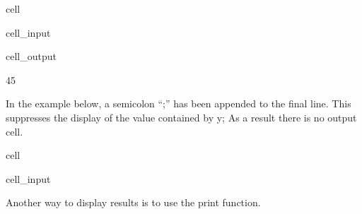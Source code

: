 \documentclass[letterpaper,10pt,english]{jupyterBook}
\begin{document}
\begin{sphinxuseclass}{cell}\begin{sphinxVerbatimInput}

\begin{sphinxuseclass}{cell_input}
\begin{sphinxVerbatim}[commandchars=\\\{\}]
  
  
\end{sphinxVerbatim}

\end{sphinxuseclass}\end{sphinxVerbatimInput}
\begin{sphinxVerbatimOutput}

\begin{sphinxuseclass}{cell_output}
\begin{sphinxVerbatim}[commandchars=\\\{\}]
45
\end{sphinxVerbatim}

\end{sphinxuseclass}\end{sphinxVerbatimOutput}

\end{sphinxuseclass}
\sphinxAtStartPar
{}

\sphinxAtStartPar
In the example below, a semi\sphinxhyphen{}colon “;” has been appended to the final line.  This suppresses the display of the value contained by y;  As a result there is no output cell.

\begin{sphinxuseclass}{cell}\begin{sphinxVerbatimInput}

\begin{sphinxuseclass}{cell_input}
\begin{sphinxVerbatim}[commandchars=\\\{\}]
  
  
\end{sphinxVerbatim}

\end{sphinxuseclass}\end{sphinxVerbatimInput}

\end{sphinxuseclass}
\sphinxAtStartPar
Another way to display results is to use the print function.
\end{document}
